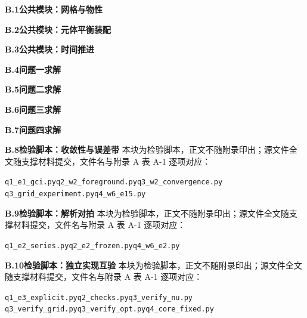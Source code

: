 \small

\noindent\textbf{B.1\quad 公共模块：网格与物性}

\noindent\textbf{B.2\quad 公共模块：元体平衡装配}

\noindent\textbf{B.3\quad 公共模块：时间推进}

\noindent\textbf{B.4\quad 问题一求解}

\noindent\textbf{B.5\quad 问题二求解}

\noindent\textbf{B.6\quad 问题三求解}

\noindent\textbf{B.7\quad 问题四求解}

\noindent\textbf{B.8\quad 检验脚本：收敛性与误差带}
\noindent\footnotesize 本块为检验脚本，正文不随附录印出；源文件全文随支撑材料提交，文件名与附录 A 表 A-1 逐项对应：
\begingroup\raggedright\sloppy
\noindent \texttt{q1\_\allowbreak{}e1\_\allowbreak{}gci.py}\quad \texttt{q2\_\allowbreak{}w2\_\allowbreak{}foreground.py}\quad \texttt{q3\_\allowbreak{}w2\_\allowbreak{}convergence.py}
\noindent \texttt{q3\_\allowbreak{}grid\_\allowbreak{}experiment.py}\quad \texttt{q4\_\allowbreak{}w6\_\allowbreak{}e15.py}
\par\endgroup

\noindent\textbf{B.9\quad 检验脚本：解析对拍}
\noindent\footnotesize 本块为检验脚本，正文不随附录印出；源文件全文随支撑材料提交，文件名与附录 A 表 A-1 逐项对应：
\begingroup\raggedright\sloppy
\noindent \texttt{q1\_\allowbreak{}e2\_\allowbreak{}series.py}\quad \texttt{q2\_\allowbreak{}e2\_\allowbreak{}frozen.py}\quad \texttt{q4\_\allowbreak{}w6\_\allowbreak{}e2.py}
\par\endgroup

\noindent\textbf{B.10\quad 检验脚本：独立实现互验}
\noindent\footnotesize 本块为检验脚本，正文不随附录印出；源文件全文随支撑材料提交，文件名与附录 A 表 A-1 逐项对应：
\begingroup\raggedright\sloppy
\noindent \texttt{q1\_\allowbreak{}e3\_\allowbreak{}explicit.py}\quad \texttt{q2\_\allowbreak{}checks.py}\quad \texttt{q3\_\allowbreak{}verify\_\allowbreak{}nu.py}
\noindent \texttt{q3\_\allowbreak{}verify\_\allowbreak{}grid.py}\quad \texttt{q3\_\allowbreak{}verify\_\allowbreak{}opt.py}\quad \texttt{q4\_\allowbreak{}core\_\allowbreak{}fixed.py}
\par\endgroup

